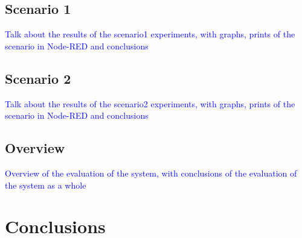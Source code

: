 \subsection{Scenario 1}\label{sec:discussion_scenario1}

\textcolor{blue}{Talk about the results of the scenario1 experiments, with graphs, prints of the scenario in Node-RED and conclusions}

\subsection{Scenario 2}\label{sec:discussion_scenario2}

\textcolor{blue}{Talk about the results of the scenario2 experiments, with graphs, prints of the scenario in Node-RED and conclusions}

\subsection{Overview}\label{sec:discussion_overview}

\textcolor{blue}{Overview of the evaluation of the system, with conclusions of the evaluation of the system as a whole}

\section{Conclusions}\label{sec:evaluation_conclusions}

